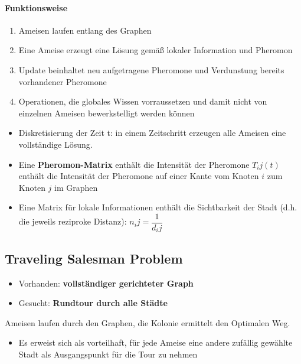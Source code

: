 \paragraph{Funktionsweise}
\begin{enumerate}
	\item Ameisen laufen entlang des Graphen
	\item Eine Ameise erzeugt eine Lösung gemäß lokaler Information und Pheromon
	\item Update beinhaltet neu aufgetragene Pheromone und Verdunstung bereits vorhandener Pheromone
	\item Operationen, die globales Wissen vorraussetzen und damit nicht von einzelnen Ameisen bewerkstelligt werden können
\end{enumerate}
\begin{itemize}
	\item Diskretisierung der Zeit t: in einem Zeitschritt erzeugen alle Ameisen eine vollständige Lösung.
	\item Eine \textbf{Pheromon-Matrix} enthält die  Intensität der Pheromone $T_ij(t)$ enthält die Intensität der Pheromone auf einer Kante vom Knoten $i$ zum Knoten $j$ im Graphen
	\item Eine Matrix für lokale Informationen enthält die Sichtbarkeit der Stadt (d.h. die jeweils reziproke Distanz): $n_ij = \dfrac{1 }{d_ij}$
\end{itemize}
\subsection{Traveling Salesman Problem}
\begin{itemize}
	\item Vorhanden: \textbf{vollständiger gerichteter Graph} 
	\item Gesucht: \textbf{Rundtour durch alle Städte}
\end{itemize}
Ameisen laufen durch den Graphen, die Kolonie ermittelt den Optimalen Weg.
\begin{itemize}
	\item Es erweist sich als vorteilhaft, für jede Ameise eine andere zufällig gewählte Stadt als Ausgangspunkt für die Tour zu nehmen
\end{itemize}
